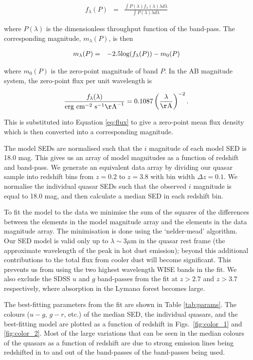 \begin{eqnarray}
  \label{eq:flux}
  f_{\lambda}(P) & = & \frac{\int P(\lambda) f_\lambda(\lambda) \lambda d\lambda }{\int P(\lambda) \lambda d\lambda}
\end{eqnarray}

where $P(\lambda)$ is the dimensionless throughput function of the band-pass. 
The corresponding magnitude, $m_\lambda(P)$, is then 

\begin{eqnarray}
  m_\lambda(P) & = & -2.5{\rm log}(f_\lambda(P)) - m_0(P)
\end{eqnarray}

where $m_0(P)$ is the zero-point magnitude of band $P$. In the AB magnitude system, the zero-point flux per unit wavelength is 

\begin{eqnarray}
  \frac{f_\lambda(\lambda)}{{\rm erg}~{\rm cm}^{-2}~{\rm s}^{-1} {\rm\AA}^{-1}} = 0.1087 \left(\frac{\lambda}{\rm \AA}\right)^{-2} .
\end{eqnarray}

This is substituted into Equation \ref{eq:flux} to give a zero-point mean flux density which is then converted into a corresponding magnitude.  

The model SEDs are normalised such that the $i$ magnitude of each model SED is 18.0 mag. 
This gives us an array of model magnitudes as a function of redshift and band-pass. 
We generate an equivalent data array by dividing our quasar sample into redshift bins from $z=0.2$ to $z=3.8$ with bin width $\Delta z = 0.1$. 
We normalise the individual quasar SEDs such that the observed $i$ magnitude is equal to 18.0 mag, and then calculate a median SED in each redshift bin. 

To fit the model to the data we minimise the sum of the squares of the differences between the elements in the model magnitude array and the elements in the data magnitude array. 
The minimisation is done using the `nelder-mead' algorithm. 
Our SED model is valid only up to $\lambda \sim 3\mu$m in the quasar rest frame (the approximate wavelength of the peak in hot dust emission); beyond this additional contributions to the total flux from cooler dust will become significant. 
This prevents us from using the two highest wavelength WISE bands in the fit. 
We also exclude the SDSS $u$ and $g$ band-passes from the fit at $z > 2.7$ and $z > 3.7$ respectively, where absorption in the Lyman$\alpha$ forest becomes large. 

The best-fitting parameters from the fit are shown in Table \ref{tab:params}. 
The colours ($u - g$, $g - r$, etc.) of the median SED, the individual quasars, and the best-fitting model are plotted as a function of redshift in Figs.~\ref{fig:color_1} and \ref{fig:color_2}.  
Most of the large variations that can be seen in the median colours of the quasars as a function of redshift are due to strong emission lines being redshifted in to and out of the band-passes of the band-passes being used. 

